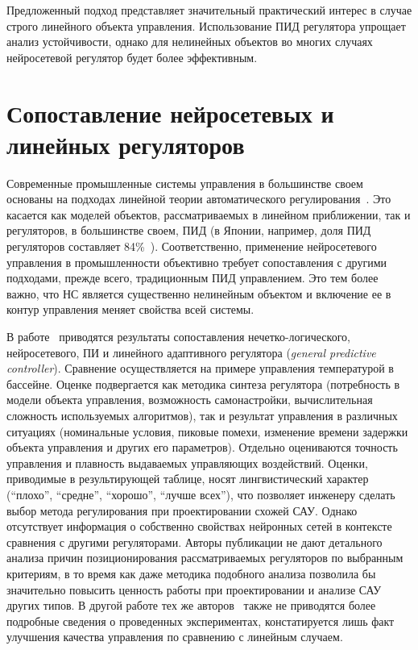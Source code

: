 Предложенный подход представляет значительный практический интерес в
случае строго линейного объекта управления.  Использование ПИД
регулятора упрощает анализ устойчивости, однако для нелинейных
объектов во многих случаях нейросетевой регулятор будет более
эффективным.

\section{Сопоставление нейросетевых и линейных регуляторов}

Современные промышленные системы управления в большинстве своем
основаны на подходах линейной теории автоматического
регулирования~\cite{warwick96}.  Это касается как моделей объектов,
рассматриваемых в линейном приближении, так и регуляторов, в
большинстве своем, ПИД (в Японии, например, доля ПИД регуляторов
составляет 84\%~\cite{sigom00}).  Соответственно, применение
нейросетевого управления в промышленности объективно требует
сопоставления с другими подходами, прежде всего, традиционным ПИД
управлением.  Это тем более важно, что НС является существенно
нелинейным объектом и включение ее в контур управления меняет свойства
всей системы.

В работе~\cite{khomyu96} приводятся результаты сопоставления
нечетко-логического, {нейросете\-во\-го}, ПИ и линейного адаптивного
регулятора ({\em general predictive controller}).  Сравнение
осуществляется на примере управления температурой в бассейне.  Оценке
подвергается как методика синтеза регулятора (потребность в модели
объекта управления, возможность самонастройки, вычислительная
сложность используемых алгоритмов), так и результат управления в
различных ситуациях (номинальные условия, пиковые помехи, изменение
времени задержки объекта управления и других его параметров).
Отдельно оцениваются точность управления и плавность выдаваемых
управляющих воздействий.  Оценки, приводимые в результирующей таблице,
носят лингвистический характер (``плохо'', ``средне'', ``хорошо'',
``лучше всех''), что позволяет инженеру сделать выбор метода
регулирования при проектировании схожей САУ.  Однако отсутствует
информация о собственно свойствах нейронных сетей в контексте
сравнения с другими регуляторами.  Авторы публикации не дают
детального анализа причин позиционирования рассматриваемых регуляторов
по выбранным критериям, в то время как даже методика подобного анализа
позволила бы значительно повысить ценность работы при проектировании и
анализе САУ других типов.  В другой работе тех же
авторов~\cite{sigom00} также не приводятся более подробные сведения о
проведенных экспериментах, констатируется лишь факт улучшения качества
управления по сравнению с линейным случаем.

